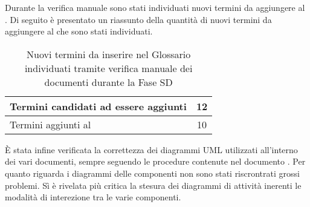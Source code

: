 				Durante la verifica manuale sono stati individuati nuovi termini da aggiungere al . Di seguito è presentato un 
				riassunto della quantità di nuovi termini da aggiungere al  che sono stati individuati.
				\begin{table}[H]
					\centering
					\begin{tabu}{| l | c |}
						\hline
						Termini candidati ad essere aggiunti	&	12\\ \hline
						Termini aggiunti al 	& 10\\ \hline
					\end{tabu}
					\caption{Nuovi termini da inserire nel Glossario individuati tramite verifica manuale dei documenti durante la Fase SD}
				\end{table}
				È stata infine verificata la correttezza dei diagrammi UML utilizzati all'interno dei vari documenti, sempre seguendo le procedure contenute nel documento . Per quanto riguarda i diagrammi delle componenti non sono stati riscrontrati grossi problemi. Sì è rivelata più critica la stesura dei diagrammi di attività inerenti le modalità di interezione tra le varie componenti.
				
